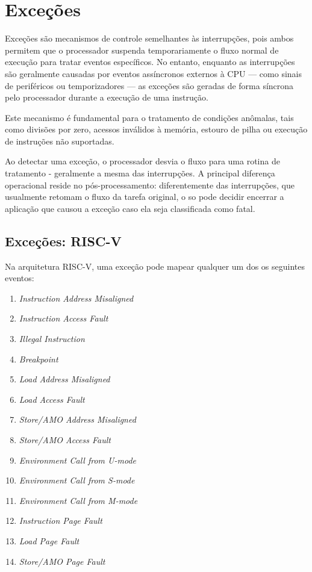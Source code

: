 \section{Exceções}

Exceções são mecanismos de controle semelhantes às interrupções, pois ambos permitem que o processador suspenda temporariamente o fluxo normal de execução para tratar eventos
específicos. No entanto, enquanto as interrupções são geralmente causadas por eventos assíncronos externos à CPU — como sinais de periféricos ou temporizadores —
as exceções são geradas de forma síncrona pelo processador durante a execução de uma instrução.

Este mecanismo é fundamental para o tratamento de condições anômalas, tais como divisões por zero, acessos inválidos à memória, estouro de pilha ou execução de instruções não suportadas.

Ao detectar uma exceção, o processador desvia o fluxo para uma rotina de tratamento - geralmente a mesma das interrupções. A principal diferença operacional reside no pós-processamento:
diferentemente das interrupções, que usualmente retomam o fluxo da tarefa original, o \gls{so} pode decidir encerrar a aplicação que causou a exceção caso ela seja classificada como fatal.

\subsection{Exceções: RISC-V}

Na arquitetura RISC-V, uma exceção pode mapear qualquer um dos os seguintes eventos:

\begin{enumerate}
    \item \textit{Instruction Address Misaligned}
    \item \textit{Instruction Access Fault}
    \item \textit{Illegal Instruction}
    \item \textit{Breakpoint}
    \item \textit{Load Address Misaligned}
    \item \textit{Load Access Fault}
    \item \textit{Store/AMO Address Misaligned}
    \item \textit{Store/AMO Access Fault}
    \item \textit{Environment Call from U-mode}
    \item \textit{Environment Call from S-mode}
    \item \textit{Environment Call from M-mode}
	\item \textit{Instruction Page Fault}
    \item \textit{Load Page Fault}
    \item \textit{Store/AMO Page Fault}
\end{enumerate}
